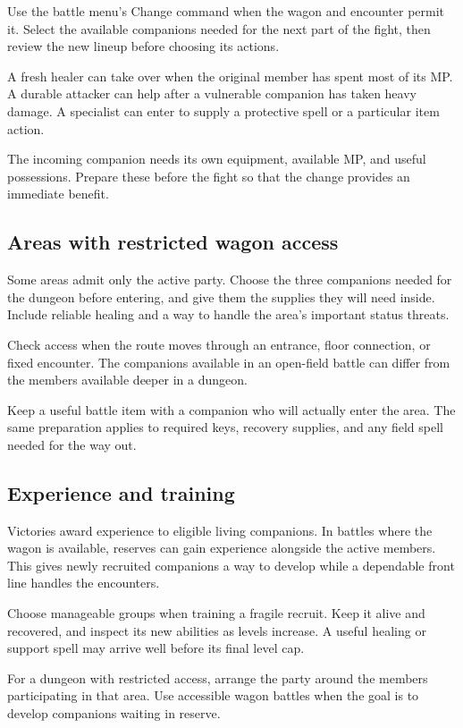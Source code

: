 Use the battle menu's Change command when the wagon and encounter permit
it. Select the available companions needed for the next part of the fight,
then review the new lineup before choosing its actions.

A fresh healer can take over when the original member has spent most of
its MP. A durable attacker can help after a vulnerable companion has
taken heavy damage. A specialist can enter to supply a protective spell
or a particular item action.

The incoming companion needs its own equipment, available MP, and useful
possessions. Prepare these before the fight so that the change provides
an immediate benefit.

\subsection*{Areas with restricted wagon access}

Some areas admit only the active party. Choose the three companions needed
for the dungeon before entering, and give them the supplies they will
need inside. Include reliable healing and a way to handle the area's
important status threats.

Check access when the route moves through an entrance, floor connection,
or fixed encounter. The companions available in an open-field battle can
differ from the members available deeper in a dungeon.

Keep a useful battle item with a companion who will actually enter the
area. The same preparation applies to required keys, recovery supplies,
and any field spell needed for the way out.

\subsection*{Experience and training}

Victories award experience to eligible living companions. In battles
where the wagon is available, reserves can gain experience alongside the
active members. This gives newly recruited companions a way to develop
while a dependable front line handles the encounters.

Choose manageable groups when training a fragile recruit. Keep it alive
and recovered, and inspect its new abilities as levels increase. A useful
healing or support spell may arrive well before its final level cap.

For a dungeon with restricted access, arrange the party around the members
participating in that area. Use accessible wagon battles when the goal
is to develop companions waiting in reserve.

